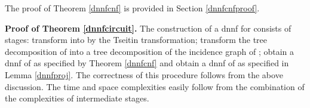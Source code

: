 \documentclass{llncs}
\begin{document}
The proof of Theorem \ref{dnnfcnf} is provided in Section \ref{dnnfcnfproof}.
\begin{comment}
We omit the proof of Theorem \ref{dnnfcnf} due to space constraints. It is similar to the proof of Theorem 16 of
\cite{DarwicheJACM}, essentially based on dynamic programming. The difference is that in addition to branching on 
assignments of variables of the given bag, the algorithm also needs to branch on the clauses of that bag that are not 
satisfied by the currently considered assignment of variables. Three choices need to be considered for each clause: to 
not satisfy the clause at all (this choice is needed for `coordination' with the `parent bag'), to satisfy the clause by
the variables of the left child and to satisfy the clause by the variables of the right child. These  choices increase
the base of the exponent from  to . 
\end{comment}

{\bf Proof of Theorem \ref{dnnfcircuit}.}
The construction of a {\sc dnnf} for  consists of  stages: transform  into  by the Tseitin transformation;
transform the tree decomposition of  into a tree decomposition of the incidence graph of ; obtain a {\sc dnnf}
of  as specified by Theorem \ref{dnnfcnf} and obtain a {\sc dnnf} of  as specified in Lemma \ref{dnnfproj}.
The correctness of this procedure follows from the above discussion. The time and space complexities easily follow from 
the combination of the complexities of intermediate stages. 

\begin{comment}
Apply the Tseitin transformation on  to transform it into a {\sc cnf} . 
Next, transform the tree decomposition  of  into a tree decomposition
 of  as specified in Lemma \ref{decomp}.
Further on, given  and , obtain a {\sc dnnf}  of  as specified in
Lemma \ref{dnnfcnf}. Since the number nodes of  is , and the width is at most ,  is constructed in time . Clearly, this time absorbs the runtime of the previous two transformations and hence can be considered as the runtime of the whole transformation. 
It follows from the combination of Lemmas \ref{tseitin}, \ref{tseitindecomp}, and \ref{dnnfcnf} that 
the function computed by  is the projection of the function computed by  to the set of original
variables of .  Following Theorem 9 in the paper \cite{DNNFJACM} of Darwiche, we transform  into a {\sc dnnf}
 computing the same function as  by simply replacing all wires whose inputs are literals of redundant variables
with wires having the same output but whose input is the  constant. Clearly, this operation does not affect the runtime
nor the size of the resulting {\sc dnnf}.  
\end{comment}
\end{document}

